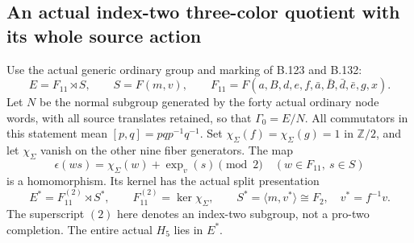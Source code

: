 \subsection*{An actual index-two three-color quotient with its whole source action}
\label{stmt:B174}
Use the actual generic ordinary group and marking of B.123 and B.132:
\[
 E=F_{11}\rtimes S,\qquad S=F(m,v),\qquad
 F_{11}=F(a,B,d,e,f,\bar a,\bar B,\bar d,\bar e,g,x).
\]
Let \(N\) be the normal subgroup generated by the forty actual ordinary
node words, with all source translates retained, so that
\(\Gamma _0=E/N\). All commutators in this statement mean
\([p,q]=pqp^{-1}q^{-1}\).
Set \(\chi_\Sigma(f)=\chi_\Sigma(g)=1\) in \(\mathbb Z/2\),
and let \(\chi_\Sigma\) vanish on the other nine fiber generators.
The map
\[
 \epsilon(ws)=\chi_\Sigma(w)+\operatorname{exp}_v(s)\pmod2
 \quad(w\in F_{11},\ s\in S)
\]
is a homomorphism. Its kernel has the actual split presentation
\begin{equation}\label{eq:B174-index-two}
 E^*=F_{11}^{(2)}\rtimes S^*,\qquad
 F_{11}^{(2)}=\ker\chi_\Sigma,\qquad
 S^*=\langle m,v^*\rangle\cong F_2,
 \quad v^*=f^{-1}v.
\end{equation}
The superscript \((2)\) here denotes an index-two subgroup, not a
pro-two completion. The entire actual \(H_5\) lies in \(E^*\).

